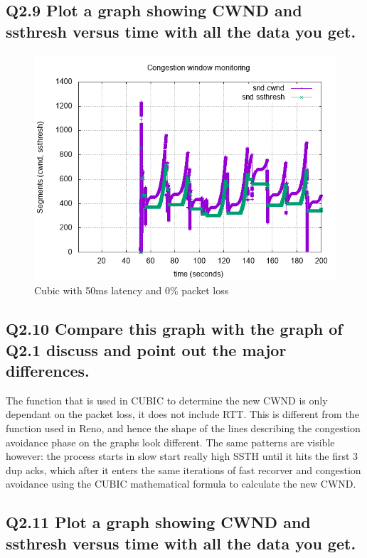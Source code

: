 \documentclass{article}
\begin{document}
\newpage

\subsection{Q2.9 Plot a graph showing CWND and ssthresh versus time with
all the data you get.}

\begin{figure}[h]
    \centering
    \includegraphics[scale=0.6]{images/lab1-group11-task2-question9.png}
    \caption{Cubic with 50ms latency and 0\% packet loss }
    \label{fig:lab1-group11-task2-question9}
\end{figure}

\subsection{Q2.10 Compare this graph with the graph of Q2.1 discuss and point out the major differences.}

The function that is used in CUBIC to determine the new CWND is only dependant on the packet loss, it does not include RTT. This is different from the function used in Reno, and hence the shape of the lines describing the congestion avoidance phase on the graphs look different. The same patterns are visible however: the process starts in slow start really high SSTH until it hits the first 3 dup acks, which after it enters the same iterations of fast recorver and congestion avoidance using the CUBIC mathematical formula to calculate the new CWND.

\newpage

\subsection{Q2.11 Plot a graph showing CWND and ssthresh versus time
with all the data you get.}
\end{document}
